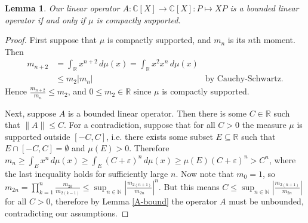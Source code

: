 \documentclass[12pt,oneside]{report}
\newtheorem{lem}[thm]{Lemma}
\begin{document}

\begin{lem}
    Our linear operator $A: \mathbb{C}[X] \to \mathbb{C}[X]: P \mapsto XP$ is a bounded linear operator if and only if $\mu$ is compactly supported.
\end{lem}
\begin{proof}
    First suppose that $\mu$ is compactly supported, and $m_{n}$ is its $n$th moment. Then 
    \begin{align*}
        m_{n+2} &= \int_{\mathbb{R}} x^{n+2} \, d\mu(x) = \int _{\mathbb{R}} x^{2}x^{n} \, d\mu(x) \\
        &\leq m_{2}|m_{n}| & \text{by Cauchy-Schwartz.}
    \end{align*}
    Hence $\frac{m_{n+2}}{m_{n}} \leq m_{2}$, and $0 \leq m_{2} \in \mathbb{R}$ since $\mu$ is compactly supported.


    Next, suppose $A$ is a bounded linear operator. Then there is some $C \in \mathbb{R}$ such that $\|A\| \leq C$. For a contradiction, suppose that for all $C > 0$ the measure $\mu$ is supported outside $[-C, C]$, i.e. there exists some subset $E \subseteq \mathbb{R}$ such that $E \cap [-C, C] = \emptyset$ and $\mu(E) > 0$. Therefore $m_{n} \geq \int _{E} x^{n} \, d\mu(x) \geq \int _{E} (C + \varepsilon)^{n} \, d\mu(x) \geq \mu(E)(C + \varepsilon)^{n} > C^{n}$, where the last inequality holds for sufficiently large $n$. Now note that $m_0 = 1$, so $m_{2n} = \prod_{k=1}^{n} \frac{m_{2k}}{m_{2(k-1)}} \leq \sup_{n \in \mathbb{N}} \left| \frac{m_{2(n+1)}}{m_{2n}} \right|^n$. But this means $C \leq \sup_{n \in \mathbb{N}} \left| \frac{m_{2(n+1)}}{m_{2n}} \right|$ for all $C > 0$, therefore by Lemma \ref{A-bound} the operator $A$ must be unbounded, contradicting our assumptions.
\end{proof}
\end{document}
